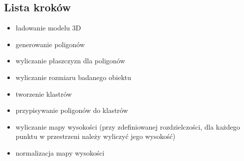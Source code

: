 \documentclass[a4paper,12pt,twoside,openany]{report}
\begin{document}
    \subsection{Lista kroków}
      \begin{itemize}
        \item ładowanie modelu 3D
        \item generowanie poligonów
        \item wyliczanie płaszczyzn dla poligonów
        \item wyliczanie rozmiaru badanego obiektu
        \item tworzenie klastrów
        \item przypisywanie poligonów do klastrów
        \item wyliczanie mapy wysokości (przy zdefiniowanej rozdzielczości, dla każdego punktu w przestrzeni należy wyliczyć jego wysokość)
        \item normalizacja mapy wysokości
      \end{itemize}























































\begin{thebibliography}{99}

\end{thebibliography}

\zakonczenie
\end{document}
